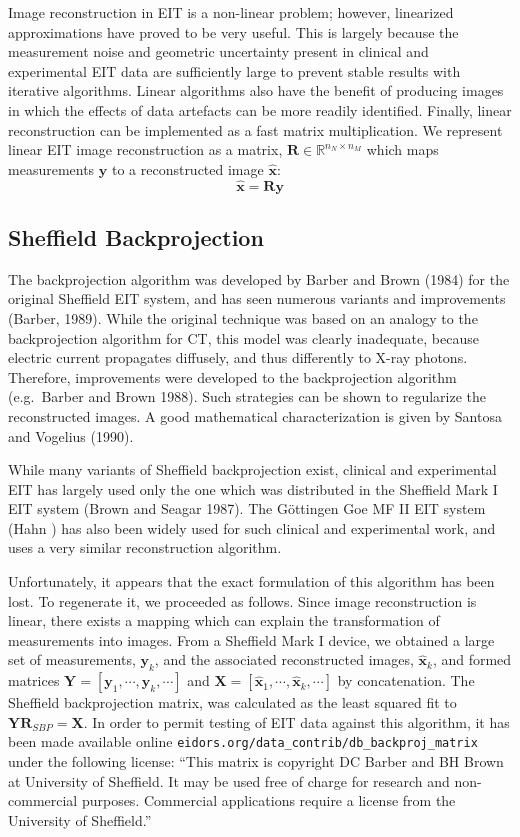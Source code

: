\documentclass[12pt]{iopart}
\newcommand{\xH}{\mbox{$\mathbf{\hat x}$}}
\newcommand{\yB}{\mbox{$\mathbf{y}$}}
\newcommand{\RB}{\mbox{$\mathbf{R}$}}
\newcommand{\XB}{\mbox{$\mathbf{X}$}}
\newcommand{\YB}{\mbox{$\mathbf{Y}$}}
\begin{document}
Image reconstruction in EIT is a non-linear problem; however,
linearized approximations have proved to be very useful.
This is largely because the measurement noise and
geometric uncertainty present in clinical
and experimental EIT data are sufficiently large
to prevent stable results with iterative algorithms.
Linear algorithms also have the benefit of producing
images in which the effects
of data artefacts can be more readily identified. Finally,
linear reconstruction can be implemented as a fast matrix
multiplication. We represent linear EIT image reconstruction
as a matrix, $\RB\in\mathbb{R}^{n_N\times n_M}$ which
maps measurements $\yB$ to a reconstructed image $\xH$:
\begin{equation} 
\label{reconst_eqn}
   \xH = \RB \yB
\end{equation} 
 

\subsection{Sheffield Backprojection}

The backprojection algorithm was developed by 
Barber and Brown (1984) for the original 
Sheffield EIT system, and  has seen numerous 
variants and improvements (Barber, 1989). While the original
technique was based on an analogy to the backprojection
algorithm for CT, this model was clearly inadequate, because
electric current propagates diffusely, and thus differently
to X-ray photons. Therefore, improvements
were developed to the backprojection algorithm
(e.g.\ Barber and Brown 1988). Such strategies
can be shown to regularize the reconstructed images.
A good mathematical characterization is given by
Santosa and Vogelius (1990).

While many variants of Sheffield backprojection exist,
clinical and experimental EIT has largely used only
the one which was distributed in the
Sheffield Mark I EIT system (Brown and Seagar 1987).
The G\"ottingen Goe MF II EIT system (Hahn )
has also been widely used for such clinical and
experimental work, and uses a very similar reconstruction
algorithm.

Unfortunately, it appears that the exact formulation
of this algorithm has been
lost. To regenerate it, we proceeded as follows.
Since image reconstruction is linear, there exists
a mapping which can explain the transformation of
measurements into images. From a Sheffield Mark I device,
we obtained a large set of
measurements, $\yB_k$, and the associated
reconstructed images, $\xH_k$, and formed matrices
$\YB = [ \yB_1, \cdots, \yB_k, \cdots]$ and 
$\XB = [ \xH_1, \cdots, \xH_k, \cdots]$ by concatenation.
The Sheffield backprojection matrix, was
calculated as the least squared fit to
   $\YB \RB_{SBP} = \XB$.
In order to permit testing of EIT data against
this algorithm, it has been made available
online 
\verb$eidors.org/data_contrib/db_backproj_matrix$
under the following license:
``This matrix is copyright DC Barber and BH Brown at
  University of Sheffield. It may be used free of charge
  for research and non-commercial purposes. Commercial
  applications require a license from the University of Sheffield.''
\end{document}
